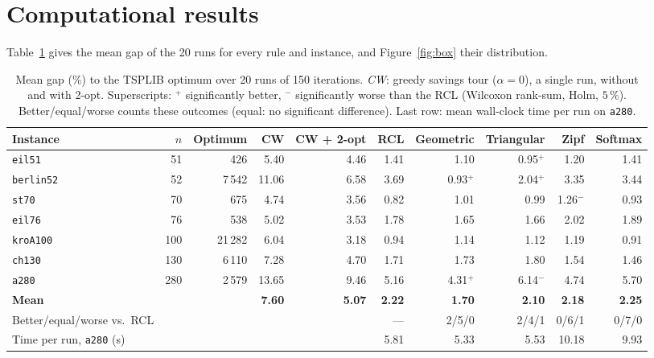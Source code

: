 \documentclass[10pt,a4paper]{article}
\begin{document}
\section{Computational results}
\label{sec:res}

Table~\ref{tab:results} gives the mean gap of the 20 runs for every rule and instance, and Figure~\ref{fig:box} their distribution.

\begin{table}[!t]
\centering
\caption{Mean gap (\%) to the TSPLIB optimum over 20 runs of 150 iterations. \emph{CW}: greedy savings tour ($\alpha=0$), a single run,
without and with 2-opt. Superscripts: $^{+}$ significantly better, $^{-}$ significantly
worse than the RCL (Wilcoxon rank-sum, Holm, $5\,\%$). Better/equal/worse counts these outcomes (equal: no significant difference). Last row: mean wall-clock time per run on
\texttt{a280}.}
\label{tab:results}
\scriptsize
\setlength{\tabcolsep}{5pt}
\begin{tabular}{@{}lrrrrrrrrr@{}}
\toprule
Instance & $n$ & Optimum & CW & CW + 2-opt & RCL & Geometric & Triangular & Zipf & Softmax \\
\midrule
\texttt{eil51}    & 51  & 426      & 5.40  & 4.46 & 1.41 & 1.10          & 0.95$^{+}$    & 1.20          & 1.41 \\
\texttt{berlin52} & 52  & 7\,542   & 11.06 & 6.58 & 3.69 & 0.93$^{+}$    & 2.04$^{+}$    & 3.35          & 3.44 \\
\texttt{st70}     & 70  & 675      & 4.74  & 3.56 & 0.82 & 1.01          & 0.99          & 1.26$^{-}$    & 0.93 \\
\texttt{eil76}    & 76  & 538      & 5.02  & 3.53 & 1.78 & 1.65          & 1.66          & 2.02          & 1.89 \\
\texttt{kroA100}  & 100 & 21\,282  & 6.04  & 3.18 & 0.94 & 1.14          & 1.12          & 1.19          & 0.91 \\
\texttt{ch130}    & 130 & 6\,110   & 7.28  & 4.70 & 1.71 & 1.73          & 1.80          & 1.54          & 1.46 \\
\texttt{a280}     & 280 & 2\,579   & 13.65 & 9.46 & 5.16 & 4.31$^{+}$    & 6.14$^{-}$    & 4.74          & 5.70 \\
\midrule
\textbf{Mean}     &     &          & \textbf{7.60} & \textbf{5.07} & \textbf{2.22} & \textbf{1.70} & \textbf{2.10} & \textbf{2.18} & \textbf{2.25} \\
Better/equal/worse vs.\ RCL & & & & & --- & 2/5/0 & 2/4/1 & 0/6/1 & 0/7/0 \\
Time per run, \texttt{a280} (s) & & & & & 5.81 & 5.33 & 5.53 & 10.18 & 9.93 \\
\bottomrule
\end{tabular}
\end{table}
\end{document}
